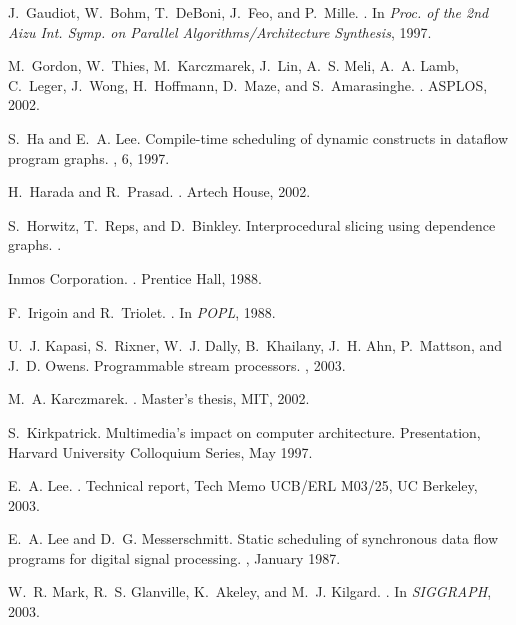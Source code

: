 \documentclass{sig-alternate}
\begin{document}
{\begin{thebibliography}{10}
J.~Gaudiot, W.~Bohm, T.~DeBoni, J.~Feo, and P.~Mille.
.
\newblock In {\em Proc. of the 2nd Aizu Int. Symp. on Parallel
  Algorithms/Architecture Synthesis}, 1997.

M.~Gordon, W.~Thies, M.~Karczmarek, J.~Lin, A.~S. Meli, A.~A. Lamb, C.~Leger,
  J.~Wong, H.~Hoffmann, D.~Maze, and S.~Amarasinghe.
.
\newblock ASPLOS, 2002.

S.~Ha and E.~A. Lee.
\newblock Compile-time scheduling of dynamic constructs in dataflow program
  graphs.
, 6, 1997.

H.~Harada and R.~Prasad.
.
\newblock Artech House, 2002.

S.~Horwitz, T.~Reps, and D.~Binkley.
\newblock Interprocedural slicing using dependence graphs.
.

{Inmos Corporation}.
.
\newblock Prentice Hall, 1988.

F.~Irigoin and R.~Triolet.
.
\newblock In {\em {POPL}}, {1988}.

U.~J. Kapasi, S.~Rixner, W.~J. Dally, B.~Khailany, J.~H. Ahn, P.~Mattson, and
  J.~D. Owens.
\newblock Programmable stream processors.
, 2003.

M.~A. Karczmarek.
.
\newblock Master's thesis, MIT, 2002.

S.~Kirkpatrick.
\newblock Multimedia's impact on computer architecture.
\newblock Presentation, Harvard University Colloquium Series, May 1997.

E.~A. Lee.
.
\newblock Technical report, Tech Memo UCB/ERL M03/25, UC Berkeley, 2003.

E.~A. Lee and D.~G. Messerschmitt.
\newblock Static scheduling of synchronous data flow programs for digital
  signal processing.
, January 1987.

W.~R. Mark, R.~S. Glanville, K.~Akeley, and M.~J. Kilgard.
.
\newblock In {\em SIGGRAPH}, 2003.


\end{thebibliography}}
\end{document}
